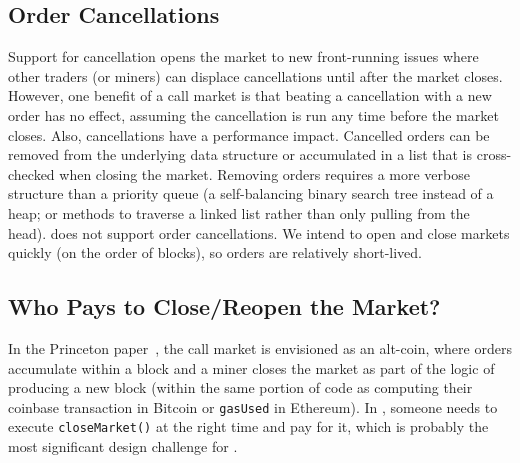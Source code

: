 
\subsection{Order Cancellations}
\label{sec:cancel}

Support for cancellation opens the market to new front-running issues where other traders (or miners) can displace cancellations until after the market closes. However, one benefit of a call market is that beating a cancellation with a new order has no effect, assuming the cancellation is run any time before the market closes. Also, cancellations have a performance impact. Cancelled orders can be removed from the underlying data structure or accumulated in a list that is cross-checked when closing the market. Removing orders requires a more verbose structure than a priority queue (\eg a self-balancing binary search tree instead of a heap; or methods to traverse a linked list rather than only pulling from the head). \cm does not support order cancellations. We intend to open and close markets quickly (on the order of blocks), so orders are relatively short-lived.






\subsection{Who Pays to Close/Reopen the Market?}
\label{sec:close}

In the Princeton paper~\cite{clark2014decentralizing}, the call market is envisioned as an alt-coin, where orders accumulate within a block and a miner closes the market as part of the logic of producing a new block (\ie within the same portion of code as computing their coinbase transaction in Bitcoin or \texttt{gasUsed} in Ethereum). In \cm, someone needs to execute  \texttt{closeMarket()} at the right time and pay for it, which is probably the most significant design challenge for \cm.

